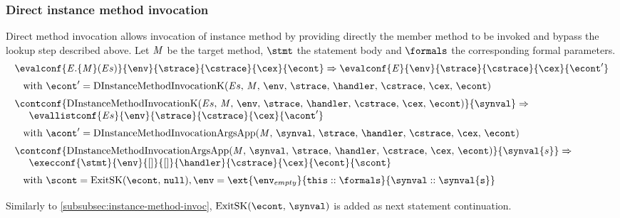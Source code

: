 \documentclass{article}
\begin{document}
\subsubsection{Direct instance method invocation}
\label{subsubsec:direct-instance-method-invoc}
Direct method invocation allows invocation of instance method by providing directly the member method to be invoked and bypass the lookup step described above. Let $\mathit{M}$ be the target method, $\stmt$ the statement body and $\formals$ the corresponding formal parameters.
\newcommand{\DInstanceMethodInvocation}[3]{#1.\{#2\}(#3)}
\newcommand{\DInstanceMethodInvocationK}{\mathrm{DInstanceMethodInvocationK}(\expressionsmeta,\,\membermeta,\,\env,\,\strace,\,\handler,\,\cstrace,\,\cex,\,\econt)}
\newcommand{\DInstanceMethodInvocationArgsApp}{\mathrm{DInstanceMethodInvocationArgsApp}(\membermeta,\,\synval,\,\strace,\,\handler,\,\cstrace,\,\cex,\,\econt)}
\[
  \begin{array}{l}
  \evalconf{\DInstanceMethodInvocation{\expressionmeta}{\membermeta}{\expressionsmeta}}{\env}{\strace}{\cstrace}{\cex}{\econt}
	\Rightarrow
	\evalconf{\expressionmeta}{\env}{\strace}{\cstrace}{\cex}{\econt'}
	\\[2mm]
	\hspace{3mm}\textrm{with } \econt' = \DInstanceMethodInvocationK\\[2mm]

  \contconf{\DInstanceMethodInvocationK}{\synval}
	\Rightarrow \\
	\hspace{5mm}\evallistconf{\expressionsmeta}{\env}{\strace}{\cstrace}{\cex}{\acont'}
	\\[2mm]
	\hspace{3mm}\textrm{with } \acont' = \DInstanceMethodInvocationArgsApp\\[2mm]

	\contconf{\DInstanceMethodInvocationArgsApp}{\synval{s}}
	\Rightarrow \\
	\hspace{5mm}\execconf{\stmt}{\env}{[]}{[]}{\handler}{\cstrace}{\cex}{\econt}{\scont}
	\\[2mm]
	\hspace{3mm}\textrm{with } \scont = \ExitSK{\tt{null}}, \env = \ext{\env_{empty}}{\this :: \formals}{\synval :: \synval{s}}\\[2mm]
  \end{array}
\]
Similarly to \ref{subsubsec:instance-method-invoc}, $\ExitSK{\synval}$ is added as next statement continuation.
\end{document}
